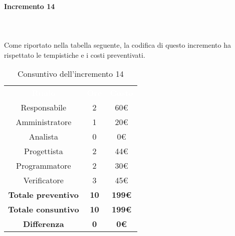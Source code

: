 \paragraph*{Incremento 14} \mbox{} \\ \mbox{} \\
Come riportato nella tabella seguente, la codifica di questo incremento ha rispettato le tempistiche e i costi preventivati.
\begin{table}[H]
\centering\renewcommand{\arraystretch}{1.5}
\caption{Consuntivo dell'incremento 14}
\vspace{0.2cm}
\begin{tabular}{ c c c }
\rowcolor{redafk}
\textcolor{white}{\textbf{Ruolo}} & \textcolor{white}{\textbf{Ore}} &
\textcolor{white}{\textbf{Costo}}  \\
Responsabile 	&  2& 60€ \\
Amministratore 	&  1 & 20€ \\
Analista 		&  0 & 0€ \\
Progettista		&  2 & 44€ \\
Programmatore	&  2 & 30€ \\
Verificatore 	&  3 & 45€ \\
\textbf{Totale preventivo} & \textbf{10} & \textbf{199€}  \\
\textbf{Totale consuntivo} & \textbf{10} &  \textbf{199€} \\
\rowcolor{lastrowcolor}
\textbf{Differenza} & \textbf{0} & \textbf{0€} \\
\end{tabular}
\end{table}

